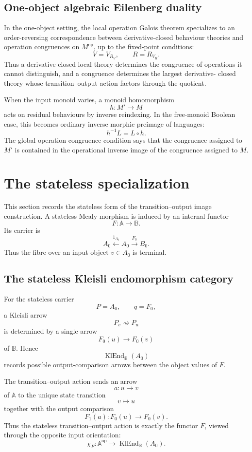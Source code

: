 \subsection{One-object algebraic Eilenberg duality}
\label{subsec:to-one-object-eilenberg}

In the one-object setting, the local operation Galois theorem specializes to
an order-reversing correspondence between derivative-closed behaviour theories
and operation congruences on \(M^{\mathrm{op}}\), up to the fixed-point
conditions:
\[
    V=V_{R_V},
    \qquad
    R=R_{V_R}.
\]
Thus a derivative-closed local theory determines the congruence of operations
it cannot distinguish, and a congruence determines the largest derivative-
closed theory whose transition--output action factors through the quotient.

When the input monoid varies, a monoid homomorphism
\[
    h:M'\to M
\]
acts on residual behaviours by inverse reindexing. In the free-monoid Boolean
case, this becomes ordinary inverse morphic preimage of languages:
\[
    h^{-1}L=L\circ h.
\]
The global operation congruence condition says that the congruence assigned to
\(M'\) is contained in the operational inverse image of the congruence assigned
to \(M\).

\section{The stateless specialization}
\label{sec:to-stateless-specialization}

This section records the stateless form of the transition--output image
construction. A stateless Mealy morphism is induced by an internal functor
\[
    F:\mathbb A\to\mathbb B.
\]
Its carrier is
\[
    A_0\xleftarrow{1_{A_0}}A_0\xrightarrow{F_0}B_0.
\]
Thus the fibre over an input object \(v\in A_0\) is terminal.

\subsection{The stateless Kleisli endomorphism category}
\label{subsec:to-stateless-klend}

For the stateless carrier
\[
    P=A_0,
    \qquad
    q=F_0,
\]
a Kleisli arrow
\[
    P_v\rightsquigarrow P_u
\]
is determined by a single arrow
\[
    F_0(u)\to F_0(v)
\]
of \(\mathbb B\). Hence
\[
    \operatorname{KlEnd}_{\mathbb B}(A_0)
\]
records possible output-comparison arrows between the object values of \(F\).

The transition--output action sends an arrow
\[
    a:u\to v
\]
of \(\mathbb A\) to the unique state transition
\[
    v\longmapsto u
\]
together with the output comparison
\[
    F_1(a):F_0(u)\to F_0(v).
\]
Thus the stateless transition--output action is exactly the functor \(F\),
viewed through the opposite input orientation:
\[
    \chi_F:
    \mathbb A^{\mathrm{op}}
    \to
    \operatorname{KlEnd}_{\mathbb B}(A_0).
\]

